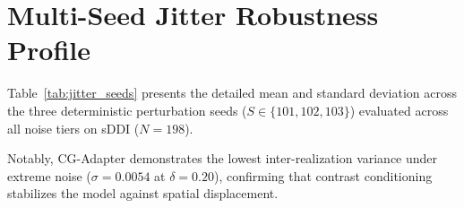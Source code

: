 \documentclass[runningheads]{llncs}
\begin{document}
\section{Multi-Seed Jitter Robustness Profile}
\label{sec:multi_seed_jitter}
Table~\ref{tab:jitter_seeds} presents the detailed mean and standard deviation across the three deterministic perturbation seeds ($S \in \{101, 102, 103\}$) evaluated across all noise tiers on sDDI ($N=198$).

\begin{table}[h!]
\centering
\caption{Prompt noise stability across 3 independent spatial jitter realizations ($M=3$, seeds $\{101, 102, 103\}$) on sDDI. Values reported as Mean $\pm$ Standard Deviation.}
\label{tab:jitter_seeds}
\end{table}

Notably, CG-Adapter demonstrates the lowest inter-realization variance under extreme noise ($\sigma = 0.0054$ at $\delta = 0.20$), confirming that contrast conditioning stabilizes the model against spatial displacement.

\end{document}
